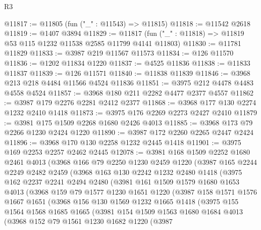 \begin{lexlean}{R3}
\begin{coremodule}
@11817 := @11805 (fun ("_" : @11543) => @11815)
@11818 := @11542 @2618
@11819 := @1407 @3894
@11829 := @11817 (fun ("_" : @11818) => @11819 @53 @115 @1232 @11538 @2585 @11799 @4141 @11803)
@11830 := @11781 @11829
@11833 := @3987 @219 @11567 @11573
@11834 := @126 @11570
@11836 := @1202 @11834 @1220
@11837 := @4525 @11836
@11838 := @11833 @11837
@11839 := @126 @11571
@11840 := @11838 @11839
@11846 := @3968 @213 @218 @4484 @11566 @4524 @11836
@11851 := @3975 @212 @4478 @4483 @4558 @4524
@11857 := @3968 @180 @211 @2282 @4477 @2377 @4557
@11862 := @3987 @179 @2276 @2281 @2412 @2377
@11868 := @3968 @177 @130 @2274 @1232 @2410 @1418
@11873 := @3975 @176 @2269 @2273 @2427 @2410
@11879 := @3981 @175 @1509 @2268 @1680 @2426 @4013
@11885 := @3968 @173 @79 @2266 @1230 @2424 @1220
@11890 := @3987 @172 @2260 @2265 @2447 @2424
@11896 := @3968 @170 @130 @2258 @1232 @2445 @1418
@11901 := @3975 @169 @2253 @2257 @2462 @2445
@12078 := @3981
    @168
    @1509
    @2252
    @1680
    @2461
    @4013
    (@3968
      @166
      @79
      @2250
      @1230
      @2459
      @1220
      (@3987
        @165
        @2244
        @2249
        @2482
        @2459
        (@3968
          @163
          @130
          @2242
          @1232
          @2480
          @1418
          (@3975
            @162
            @2237
            @2241
            @2494
            @2480
            (@3981
              @161
              @1509
              @1579
              @1680
              @1653
              @4013
              (@3968
                @159
                @79
                @1577
                @1230
                @1651
                @1220
                (@3987
                  @158
                  @1571
                  @1576
                  @1667
                  @1651
                  (@3968
                    @156
                    @130
                    @1569
                    @1232
                    @1665
                    @1418
                    (@3975
                      @155
                      @1564
                      @1568
                      @1685
                      @1665
                      (@3981
                        @154
                        @1509
                        @1563
                        @1680
                        @1684
                        @4013
                        (@3968
                          @152
                          @79
                          @1561
                          @1230
                          @1682
                          @1220
                          (@3987

\end{coremodule}
\end{lexlean}
